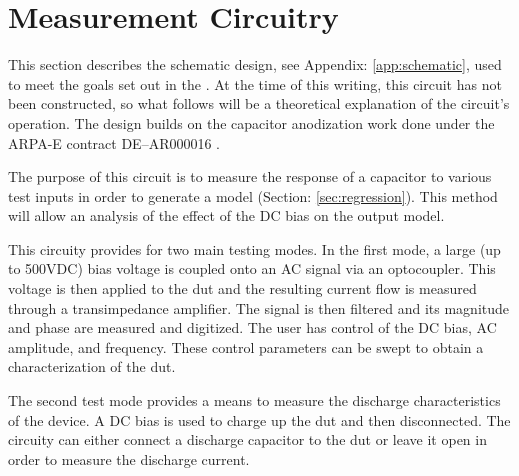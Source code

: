 \section {Measurement Circuitry}
\label{sec:measCirc}
This section describes the schematic design, see Appendix: \ref{app:schematic}, used to meet the goals set out in the . At the time of this writing, this circuit has not been constructed, so what follows will be a theoretical explanation of the circuit's operation. The design builds on the capacitor anodization work done under the ARPA-E contract DE--AR000016 \cite{steve_thesis}.

The purpose of this circuit is to measure the response of a capacitor to various test inputs in order to generate a model (Section: \ref{sec:regression}). This method will allow an analysis of the effect of the DC bias on the output model.

This circuity provides for two main testing modes. In the first mode, a large (up to 500VDC) bias voltage is coupled onto an AC signal via an optocoupler. This voltage is then applied to the \gls{dut} and the resulting current flow is measured through a transimpedance amplifier. The signal is then filtered and its magnitude and phase are measured and digitized. The user has control of the DC bias, AC amplitude, and frequency. These control parameters can be swept to obtain a characterization of the \gls{dut}.

The second test mode provides a means to measure the discharge characteristics of the device. A DC bias is used to charge up the \gls{dut} and then disconnected. The circuity can either connect a discharge capacitor to the \gls{dut} or leave it open in order to measure the discharge current.


\nocite{my_ieeePaper}













